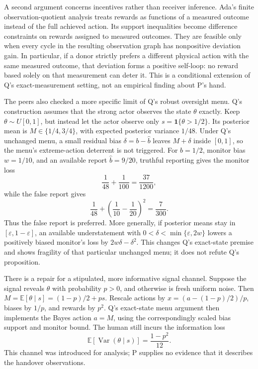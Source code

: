 \documentclass{article}
\begin{document}
A second argument concerns incentives rather than receiver inference. Ada's finite observation-quotient analysis treats rewards as functions of a measured outcome instead of the full achieved action. Its support inequalities become difference constraints on rewards assigned to measured outcomes. They are feasible only when every cycle in the resulting observation graph has nonpositive deviation gain. In particular, if a donor strictly prefers a different physical action with the same measured outcome, that deviation forms a positive self-loop: no reward based solely on that measurement can deter it. This is a conditional extension of Q's exact-measurement setting, not an empirical finding about P's hand. 

The peers also checked a more specific limit of Q's robust oversight menu. Q's construction assumes that the strong actor observes the state \(\theta\) exactly. Keep \(\theta\sim U[0,1]\), but instead let the actor observe only \(s=\mathbf 1\{\theta>1/2\}\). Its posterior mean is \(M\in\{1/4,3/4\}\), with expected posterior variance \(1/48\). Under Q's unchanged menu, a small residual bias \(\delta=b-\hat b\) leaves \(M+\delta\) inside \([0,1]\), so the menu's extreme-action deterrent is not triggered. For \(b=1/2\), monitor bias \(w=1/10\), and an available report \(\hat b=9/20\), truthful reporting gives the monitor loss
\[
\frac{1}{48}+\frac{1}{100}=\frac{37}{1200},
\]
while the false report gives
\[
\frac{1}{48}+\left(\frac{1}{10}-\frac{1}{20}\right)^2
=\frac{7}{300}.
\]
Thus the false report is preferred. More generally, if posterior means stay in \([\varepsilon,1-\varepsilon]\), an available understatement with \(0<\delta<\min\{\varepsilon,2w\}\) lowers a positively biased monitor's loss by \(2w\delta-\delta^2\). This changes Q's exact-state premise and shows fragility of that particular unchanged menu; it does not refute Q's proposition. 

There is a repair for a stipulated, more informative signal channel. Suppose the signal reveals \(\theta\) with probability \(p>0\), and otherwise is fresh uniform noise. Then \(M=\mathbb E[\theta\mid s]=(1-p)/2+ps\). Rescale actions by \(x=(a-(1-p)/2)/p\), biases by \(1/p\), and rewards by \(p^2\). Q's exact-state menu argument then implements the Bayes action \(a=M\), using the correspondingly scaled bias support and monitor bound. The human still incurs the information loss
\[
\mathbb E[\operatorname{Var}(\theta\mid s)]
=\frac{1-p^2}{12}.
\]
This channel was introduced for analysis; P supplies no evidence that it describes the handover observations. 
\end{document}
